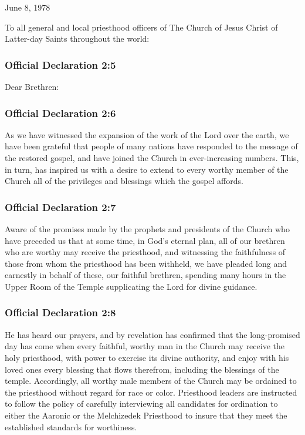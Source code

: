 		June 8, 1978
		
		To all general and local priesthood officers of The Church of Jesus Christ of Latter-day Saints throughout the world:
		
	\subsubsection{Official Declaration 2:5} %
		\label{OD2-5}
		
		Dear Brethren:
		
	\subsubsection{Official Declaration 2:6} %
		\label{OD2-6}
		
		As we have witnessed the expansion of the work of the Lord over the earth, we have been grateful that people of many nations have responded to the message of the restored gospel, and have joined the Church in ever-increasing numbers.  This, in turn, has inspired us with a desire to extend to every worthy member of the Church all of the privileges and blessings which the gospel affords.		
		
	\subsubsection{Official Declaration 2:7} %
		\label{OD2-7}
		
		Aware of the promises made by the prophets and presidents of the Church who have preceded us that at some time, in God's eternal plan, all of our brethren who are worthy may receive the priesthood, and witnessing the faithfulness of those from whom the priesthood has been withheld, we have pleaded long and earnestly in behalf of these, our faithful brethren, spending many hours in the Upper Room of the Temple supplicating the Lord for divine guidance.
		
	\subsubsection{Official Declaration 2:8} %
		\label{OD2-8}
		
		He has heard our prayers, and by revelation has confirmed that the long-promised day has come when every faithful, worthy man in the Church may receive the holy priesthood, with power to exercise its divine authority, and enjoy with his loved ones every blessing that flows therefrom, including the blessings of the temple.  Accordingly, all worthy male members of the Church may be ordained to the priesthood without regard for race or color.  Priesthood leaders are instructed to follow the policy of carefully interviewing all candidates for ordination to either the Aaronic or the Melchizedek Priesthood to insure that they meet the established standards for worthiness.
		
